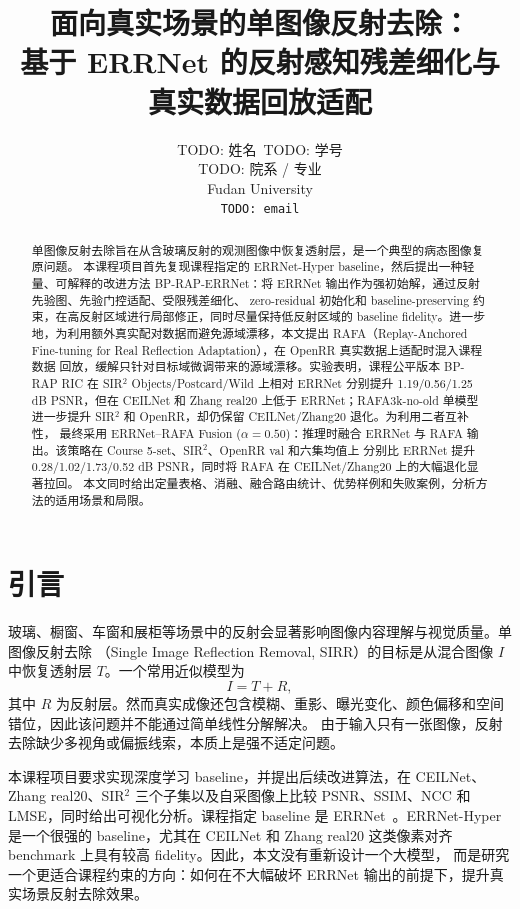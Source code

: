 \documentclass{article}
\title{面向真实场景的单图像反射去除：\\
基于 ERRNet 的反射感知残差细化与真实数据回放适配}
\author{%
  TODO: 姓名~TODO: 学号 \\
  TODO: 院系 / 专业 \\
  Fudan University \\
  \texttt{TODO: email} \\
}
\newcommand{\method}{BP-RAP}
\newcommand{\rafa}{RAFA}
\newcommand{\finalmodel}{ERRNet--RAFA Fusion ($\alpha=0.50$)}
\begin{document}
\maketitle

\begin{abstract}
单图像反射去除旨在从含玻璃反射的观测图像中恢复透射层，是一个典型的病态图像复原问题。
本课程项目首先复现课程指定的 ERRNet-Hyper baseline，然后提出一种轻量、可解释的改进方法
\method{}-ERRNet：将 ERRNet 输出作为强初始解，通过反射先验图、先验门控适配、受限残差细化、
zero-residual 初始化和 baseline-preserving 约束，在高反射区域进行局部修正，同时尽量保持低反射区域的
baseline fidelity。进一步地，为利用额外真实配对数据而避免源域漂移，本文提出
\rafa{}（Replay-Anchored Fine-tuning for Real Reflection Adaptation），在 OpenRR 真实数据上适配时混入课程数据
回放，缓解只针对目标域微调带来的源域漂移。实验表明，课程公平版本 BP-RAP RIC 在 SIR$^2$
Objects/Postcard/Wild 上相对 ERRNet 分别提升 1.19/0.56/1.25 dB PSNR，但在 CEILNet 和 Zhang real20 上低于
ERRNet；RAFA3k-no-old 单模型进一步提升 SIR$^2$ 和 OpenRR，却仍保留 CEILNet/Zhang20 退化。为利用二者互补性，
最终采用 \finalmodel{}：推理时融合 ERRNet 与 RAFA 输出。该策略在 Course 5-set、SIR$^2$、OpenRR val 和六集均值上
分别比 ERRNet 提升 0.28/1.02/1.73/0.52 dB PSNR，同时将 RAFA 在 CEILNet/Zhang20 上的大幅退化显著拉回。
本文同时给出定量表格、消融、融合路由统计、优势样例和失败案例，分析方法的适用场景和局限。
\end{abstract}

\section{引言}

玻璃、橱窗、车窗和展柜等场景中的反射会显著影响图像内容理解与视觉质量。单图像反射去除
（Single Image Reflection Removal, SIRR）的目标是从混合图像 $I$ 中恢复透射层 $T$。一个常用近似模型为
\begin{equation}
I = T + R,
\end{equation}
其中 $R$ 为反射层。然而真实成像还包含模糊、重影、曝光变化、颜色偏移和空间错位，因此该问题并不能通过简单线性分解解决。
由于输入只有一张图像，反射去除缺少多视角或偏振线索，本质上是强不适定问题。

本课程项目要求实现深度学习 baseline，并提出后续改进算法，在 CEILNet、Zhang real20、SIR$^2$ 三个子集以及自采图像上比较
PSNR、SSIM、NCC 和 LMSE，同时给出可视化分析。课程指定 baseline 是 ERRNet~\cite{wei2019errnet}。ERRNet-Hyper 是一个很强的
baseline，尤其在 CEILNet 和 Zhang real20 这类像素对齐 benchmark 上具有较高 fidelity。因此，本文没有重新设计一个大模型，
而是研究一个更适合课程约束的方向：如何在不大幅破坏 ERRNet 输出的前提下，提升真实场景反射去除效果。
\end{document}

